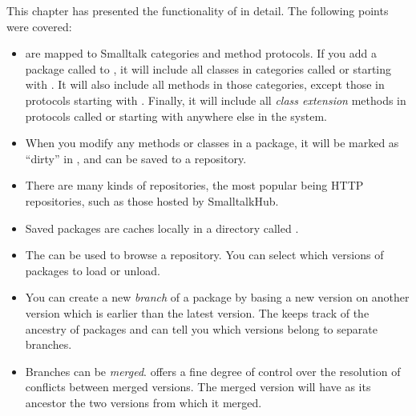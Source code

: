 \documentclass[a4paper,10pt,twoside]{book}
\begin{document}

This chapter has presented the functionality of \Mont in detail.
The following points were covered:

\begin{itemize}
\item \Mont are mapped to Smalltalk categories and method protocols.
	If you add a package called  to \Mont, it will include all classes in categories called  or starting with . It will also include all methods in those categories, except those in protocols starting with \ct{*}. Finally, it will include all \emph{class extension} methods in protocols called  or starting with  anywhere else in the system.

\item When you modify any methods or classes in a package, it will be marked as ``dirty'' in \Mont, and can be saved to a repository.

\item There are many kinds of repositories, the most popular being HTTP repositories, such as those hosted by SmalltalkHub.

\item Saved packages are caches locally in a directory called .

\item The \Mont \RI can be used to browse a repository. You can select which versions of packages to load or unload.

\item You can create a new \emph{branch} of a package by basing a new version on another version which is earlier than the latest version. The \RI keeps track of the ancestry of packages and can tell you which versions belong to separate branches.

\item Branches can be \emph{merged}. \Mont offers a fine degree of control over the resolution of conflicts between merged versions. The merged version will have as its ancestor the two versions from which it merged.



\end{itemize}
\end{document}

